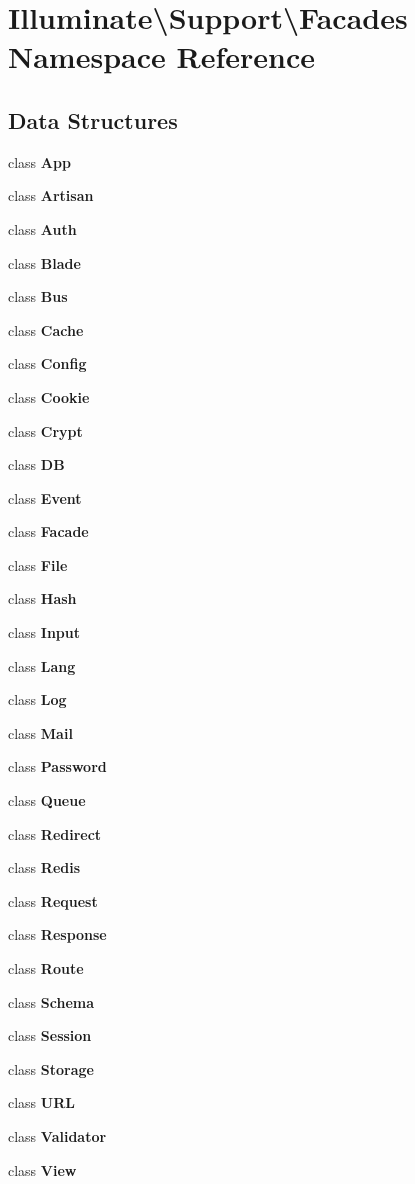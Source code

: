 \section{Illuminate\textbackslash{}Support\textbackslash{}Facades Namespace Reference}
\label{namespace_illuminate_1_1_support_1_1_facades}
\subsection*{Data Structures}
\begin{DoxyCompactItemize}
\item 
class {\bf App}
\item 
class {\bf Artisan}
\item 
class {\bf Auth}
\item 
class {\bf Blade}
\item 
class {\bf Bus}
\item 
class {\bf Cache}
\item 
class {\bf Config}
\item 
class {\bf Cookie}
\item 
class {\bf Crypt}
\item 
class {\bf D\+B}
\item 
class {\bf Event}
\item 
class {\bf Facade}
\item 
class {\bf File}
\item 
class {\bf Hash}
\item 
class {\bf Input}
\item 
class {\bf Lang}
\item 
class {\bf Log}
\item 
class {\bf Mail}
\item 
class {\bf Password}
\item 
class {\bf Queue}
\item 
class {\bf Redirect}
\item 
class {\bf Redis}
\item 
class {\bf Request}
\item 
class {\bf Response}
\item 
class {\bf Route}
\item 
class {\bf Schema}
\item 
class {\bf Session}
\item 
class {\bf Storage}
\item 
class {\bf U\+R\+L}
\item 
class {\bf Validator}
\item 
class {\bf View}
\end{DoxyCompactItemize}
